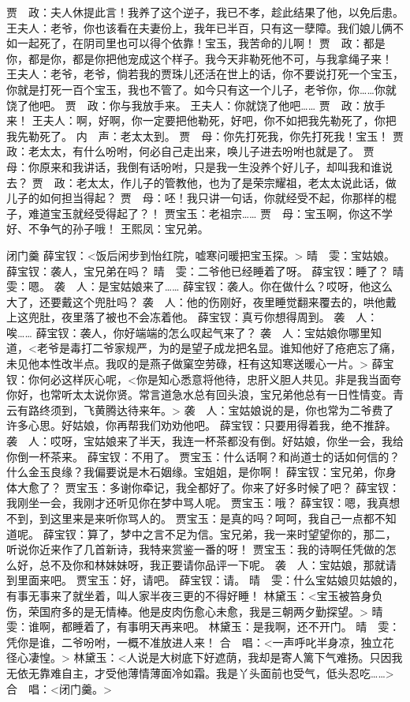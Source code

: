 \documentclass{article}
\begin{document}
贾　政：夫人休提此言！我养了这个逆子，我已不孝，趁此结果了他，以免后患。
王夫人：老爷，你也该看在夫妻份上，我年已半百，只有这一孽障。我们娘儿俩不如一起死了，在阴司里也可以得个依靠！宝玉，我苦命的儿啊！
贾　政：都是你，都是你，都是你把他宠成这个样子。我今天非勒死他不可，与我拿绳子来！
王夫人：老爷，老爷，倘若我的贾珠儿还活在世上的话，你不要说打死一个宝玉，你就是打死一百个宝玉，我也不管了。如今只有这一个儿子，老爷你，你……你就饶了他吧。
贾　政：你与我放手来。
王夫人：你就饶了他吧……
贾　政：放手来！
王夫人：啊，好啊，你一定要把他勒死，好吧，你不如把我先勒死了，你把我先勒死了。
内　声：老太太到。
贾　母：你先打死我，你先打死我！宝玉！
贾　政：老太太，有什么吩咐，何必自己走出来，唤儿子进去吩咐也就是了。
贾　母：你原来和我讲话，我倒有话吩咐，只是我一生没养个好儿子，却叫我和谁说去？
贾　政：老太太，作儿子的管教他，也为了是荣宗耀祖，老太太说此话，做儿子的如何担当得起？
贾　母：呸！我只讲一句话，你就经受不起，你那样的棍子，难道宝玉就经受得起了？！
贾宝玉：老祖宗……
贾　母：宝玉啊，你这不学好、不争气的孙子哦！
王熙凤：宝兄弟。

闭门羹
薛宝钗：<饭后闲步到怡红院，嘘寒问暖把宝玉探。>
晴　雯：宝姑娘。
薛宝钗：袭人，宝兄弟在吗？
晴　雯：二爷他已经睡着了呀。
薛宝钗：睡了？
晴　雯：嗯。
袭　人：是宝姑娘来了……
薛宝钗：袭人。你在做什么？哎呀，他这么大了，还要戴这个兜肚吗？
袭　人：他的伤刚好，夜里睡觉翻来覆去的，哄他戴上这兜肚，夜里落了被也不会冻着他。
薛宝钗：真亏你想得周到。
袭　人：唉……
薛宝钗：袭人，你好端端的怎么叹起气来了？
袭　人：宝姑娘你哪里知道，<老爷是毒打二爷家规严，为的是望子成龙把名显。谁知他好了疮疤忘了痛，未见他本性改半点。我叹的是燕子做窠空劳碌，枉有这知寒送暖心一片。>
薛宝钗：你何必这样灰心呢，<你是知心悉意将他待，忠肝义胆人共见。非是我当面夸你好，也常听太太说你贤。常言道急水总有回头浪，宝兄弟他总有一日性情变。青云有路终须到，飞黄腾达待来年。>
袭　人：宝姑娘说的是，你也常为二爷费了许多心思。好姑娘，你再帮我们劝劝他吧。
薛宝钗：只要用得着我，绝不推辞。
袭　人：哎呀，宝姑娘来了半天，我连一杯茶都没有倒。好姑娘，你坐一会，我给你倒一杯茶来。
薛宝钗：不用了。
贾宝玉：什么话啊？和尚道士的话如何信的？什么金玉良缘？我偏要说是木石姻缘。宝姐姐，是你啊！
薛宝钗：宝兄弟，你身体大愈了？
贾宝玉：多谢你牵记，我全都好了。你来了好多时候了吧？
薛宝钗：我刚坐一会，我刚才还听见你在梦中骂人呢。
贾宝玉：哦？
薛宝钗：嗯，我真想不到，到这里来是来听你骂人的。
贾宝玉：是真的吗？呵呵，我自己一点都不知道呢。
薛宝钗：算了，梦中之言不足为信。宝兄弟，我一来时望望你的，那二，听说你近来作了几首新诗，我特来赏鉴一番的呀！
贾宝玉：我的诗啊任凭做的怎么好，总不及你和林妹妹呀，我正要请你品评一下呢。
袭　人：宝姑娘，那就请到里面来吧。
贾宝玉：好，请吧。
薛宝钗：请。
晴　雯：什么宝姑娘贝姑娘的，有事无事来了就坐着，叫人家半夜三更的不得好睡！
林黛玉：<宝玉被笞身负伤，荣国府多的是无情棒。他是皮肉伤愈心未愈，我是三朝两夕勤探望。>
晴　雯：谁啊，都睡着了，有事明天再来吧。
林黛玉：是我啊，还不开门。
晴　雯：凭你是谁，二爷吩咐，一概不准放进人来！
合　唱：<一声呼叱半身凉，独立花径心凄惶。>
林黛玉：<人说是大树底下好遮荫，我却是寄人篱下气难扬。只因我无依无靠难自主，才受他薄情薄面冷如霜。我是丫头面前也受气，低头忍吃……>
合　唱：<闭门羹。>
\end{document}
